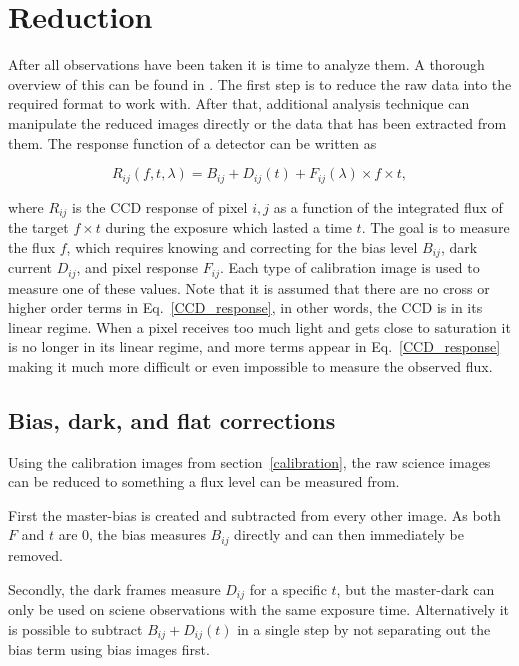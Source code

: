 \documentclass[a4paper,oneside,12pt, class=Latex/Classes/PhDthesisPSnPDF, crop=false]{standalone}
\begin{document}
\section{Reduction}
\label{reduction}
After all observations have been taken it is time to analyze them. A thorough overview of this can be found in \citet{Image_processing}. The first step is to reduce the raw data into the required format to work with. After that, additional analysis technique can manipulate the reduced images directly or the data that has been extracted from them. The response function of a detector can be written as

\begin{equation}
	R_{ij}(f, t, \lambda) = B_{ij} + D_{ij}(t) + F_{ij}(\lambda) \times f \times t,
	\label{CCD_response}
\end{equation}

where $R_{ij}$ is the CCD response of pixel $i,j$ as a function of the integrated flux of the target $f \times t$ during the exposure which lasted a time $t$. The goal is to measure the flux $f$, which requires knowing and correcting for the bias level $B_{ij}$, dark current $D_{ij}$, and pixel response $F_{ij}$. Each type of calibration image is used to measure one of these values. Note that it is assumed that there are no cross or higher order terms in Eq.~\ref{CCD_response}, in other words, the CCD is in its linear regime. When a pixel receives too much light and gets close to saturation it is no longer in its linear regime, and more terms appear in Eq.~\ref{CCD_response} making it much more difficult or even impossible to measure the observed flux.


\subsection{Bias, dark, and flat corrections}
Using the calibration images from section~\ref{calibration}, the raw science images can be reduced to something a flux level can be measured from. 

First the master-bias is created and subtracted from every other image. As both $F$ and $t$ are 0, the bias measures $B_{ij}$ directly and can then immediately be removed.

Secondly, the dark frames measure $D_{ij}$ for a specific $t$, but the master-dark can only be used on sciene observations with the same exposure time. Alternatively it is possible to subtract $B_{ij} + D_{ij}(t)$ in a single step by not separating out the bias term using bias images first.
\end{document}
